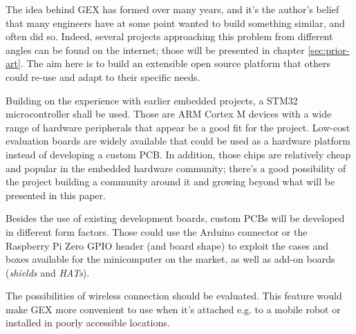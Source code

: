 The idea behind GEX has formed over many years, and it's the author's belief that many engineers have at some point wanted to build something similar, and often did so. Indeed, several projects approaching this problem from different angles can be found on the internet; those will be presented in chapter \ref{sec:prior-art}. The aim here is to build an extensible open source platform that others could re-use and adapt to their specific needs.

Building on the experience with earlier embedded projects, a STM32 microcontroller shall be used. Those are ARM Cortex M devices with a wide range of hardware peripherals that appear be a good fit for the project. Low-cost evaluation boards are widely available that could be used as a hardware platform instead of developing a custom PCB. In addition, those chips are relatively cheap and popular in the embedded hardware community; there's a good possibility of the project building a community around it and growing beyond what will be presented in this paper.

Besides the use of existing development boards, custom PCBs will be developed in different form factors. Those could use the Arduino connector or the Raspberry Pi Zero GPIO header (and board shape) to exploit the cases and boxes available for the minicomputer on the market, as well as add-on boards (\textit{shields} and \textit{HATs}).

The possibilities of wireless connection should be evaluated. This feature would make GEX more convenient to use when it's attached e.g. to a mobile robot or installed in poorly accessible locations.







